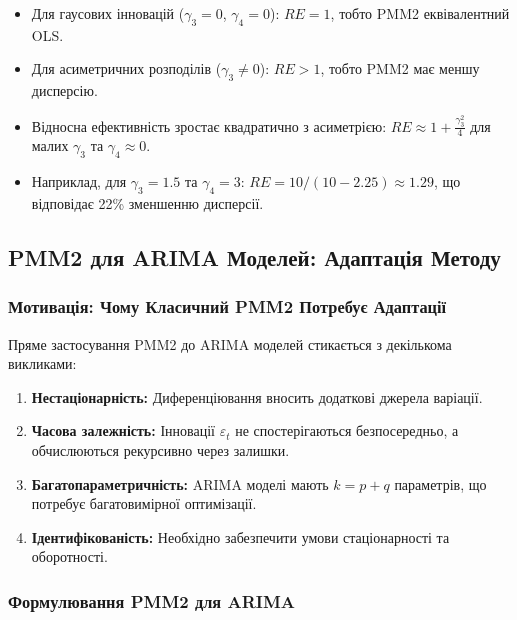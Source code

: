 \documentclass[12pt,a4paper]{article}
\begin{document}
	\begin{itemize}
		\item Для гаусових інновацій ($\gamma_3 = 0$, $\gamma_4 = 0$): $RE = 1$, тобто PMM2 еквівалентний OLS.
		
		\item Для асиметричних розподілів ($\gamma_3 \neq 0$): $RE > 1$, тобто PMM2 має меншу дисперсію.
		
		\item Відносна ефективність зростає квадратично з асиметрією: $RE \approx 1 + \frac{\gamma_3^2}{4}$ для малих $\gamma_3$ та $\gamma_4 \approx 0$.
		
		\item Наприклад, для $\gamma_3 = 1.5$ та $\gamma_4 = 3$: $RE = 10/(10 - 2.25) \approx 1.29$, що відповідає 22\% зменшенню дисперсії.
	\end{itemize}
	
	\subsection{PMM2 для ARIMA Моделей: Адаптація Методу}
	\label{subsec:pmm2_arima}
	
	\subsubsection{Мотивація: Чому Класичний PMM2 Потребує Адаптації}
	
	Пряме застосування PMM2 до ARIMA моделей стикається з декількома викликами:
	
	\begin{enumerate}
		\item \textbf{Нестаціонарність:} Диференціювання вносить додаткові джерела варіації.
		
		\item \textbf{Часова залежність:} Інновації $\varepsilon_t$ не спостерігаються безпосередньо, а обчислюються рекурсивно через залишки.
		
		\item \textbf{Багатопараметричність:} ARIMA моделі мають $k = p + q$ параметрів, що потребує багатовимірної оптимізації.
		
		\item \textbf{Ідентифікованість:} Необхідно забезпечити умови стаціонарності та оборотності.
	\end{enumerate}
	
	\subsubsection{Формулювання PMM2 для ARIMA}
	
\end{document}
